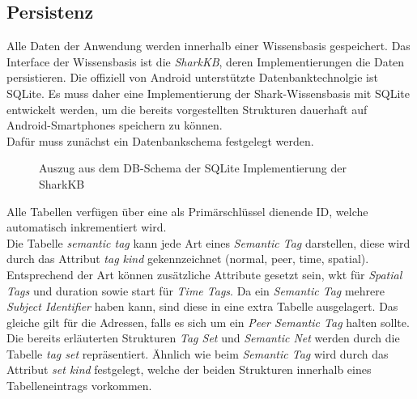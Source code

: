 \subsection{Persistenz}
\label{subsec:persistenz}
Alle Daten der Anwendung werden innerhalb einer Wissensbasis gespeichert. Das Interface der Wissensbasis ist die \textit{SharkKB}, deren Implementierungen die Daten persistieren. Die offiziell von Android unterstützte Datenbanktechnolgie ist SQLite. Es muss daher eine Implementierung der Shark-Wissensbasis mit SQLite entwickelt werden, um die bereits vorgestellten Strukturen dauerhaft auf Android-Smartphones speichern zu können. 
\\Dafür muss zunächst ein Datenbankschema festgelegt werden. 
\begin{figure}[H]
	\centering
	\caption{Auszug aus dem DB-Schema der SQLite Implementierung der SharkKB}
	\label{fig:sharkSQL}
\end{figure}
Alle Tabellen verfügen über eine als Primärschlüssel dienende ID, welche automatisch inkrementiert wird. \\Die Tabelle \textit{semantic tag} kann jede Art eines \textit{Semantic Tag} darstellen, diese wird durch das Attribut \textit{tag kind} gekennzeichnet (normal, peer, time, spatial). Entsprechend der Art können zusätzliche Attribute gesetzt sein, wkt für \textit{Spatial Tags} und duration sowie start für \textit{Time Tags}. Da ein \textit{Semantic Tag} mehrere \textit{Subject Identifier} haben kann, sind diese in eine extra Tabelle ausgelagert. Das gleiche gilt für die Adressen, falls es sich um ein \textit{Peer Semantic Tag} halten sollte. 
\\Die bereits erläuterten Strukturen \textit{Tag Set} und \textit{Semantic Net} werden durch die Tabelle \textit{tag set} repräsentiert. Ähnlich wie beim \textit{Semantic Tag} wird durch das Attribut \textit{set kind} festgelegt, welche der beiden Strukturen innerhalb eines Tabelleneintrags vorkommen.

